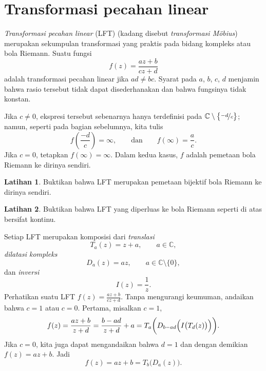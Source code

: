 \documentclass[12pt,openany]{book}
\newcommand{\C}{{\mathbb{C}}}
\newcommand{\myindex}[1]{#1\index{#1}}
\theoremstyle{plain}
\theoremstyle{remark}
\theoremstyle{definition}
\newenvironment{exbox}{%
    \def\FrameCommand{\vrule width 1pt \relax\hspace{10pt}}%
    \MakeFramed{\advance\hsize-\width\FrameRestore}%
}{%
    \endMakeFramed
}
\theoremstyle{exercise}
\newtheorem{exercise}{Latihan}[section]
\theoremstyle{example}
\begin{document}

\section{Transformasi pecahan linear}

\emph{Transformasi pecahan linear}
(LFT)
(kadang disebut \emph{\myindex{transformasi M\"obius}})
merupakan sekumpulan transformasi yang praktis pada bidang kompleks atau bola
Riemann.
Suatu fungsi
\begin{equation*}
f(z) = \frac{a z + b}{c z + d}
\end{equation*}
adalah transformasi pecahan linear jika $ad \neq bc$.  Syarat pada
$a$, $b$, $c$, $d$ menjamin bahwa rasio tersebut tidak dapat disederhanakan dan bahwa
fungsinya tidak konstan.

Jika $c \neq 0$,
ekspresi tersebut sebenarnya hanya terdefinisi pada
$\C \setminus \bigl\{ \nicefrac{-d}{c} \bigr\}$;
namun, seperti pada bagian sebelumnya, kita tulis
\begin{equation*}
f\left(\frac{-d}{c}\right) = \infty, \qquad \text{dan} \qquad
f(\infty) = \frac{a}{c} .
\end{equation*}
Jika $c=0$, tetapkan $f(\infty) = \infty$.  Dalam kedua kasus, $f$ adalah pemetaan
bola Riemann ke dirinya sendiri.

\begin{exbox}
\begin{exercise}%
Buktikan bahwa LFT merupakan pemetaan bijektif bola Riemann ke dirinya sendiri.
\end{exercise}

\begin{exercise}%
Buktikan bahwa LFT yang diperluas ke bola Riemann seperti di atas bersifat kontinu.
\end{exercise}
\end{exbox}

Setiap LFT merupakan komposisi dari \emph{translasi}
\begin{equation*}
T_a(z) = z + a , \qquad a \in \C,
\end{equation*}
\emph{dilatasi kompleks}
\begin{equation*}
D_a(z) = az , \qquad a \in \C \setminus \{ 0 \} ,
\end{equation*}
dan \emph{inversi}
\begin{equation*}
I(z) = \frac{1}{z}.
\end{equation*}
Perhatikan suatu LFT $f(z) = \frac{az+b}{cz+d}$.
Tanpa mengurangi keumuman, andaikan bahwa $c=1$ atau $c=0$.
Pertama, misalkan $c=1$,
\begin{equation*}
f(z)
=
\frac{a z + b}{z + d}
=
\frac{b-ad}{z+d}+a
=
T_a\biggr(D_{b-ad}\Bigl(I\bigl(T_d(z)\bigr)\Bigr)\biggr) .
\end{equation*}
Jika $c=0$, kita juga dapat mengandaikan bahwa $d=1$ dan
dengan demikian $f(z) = az + b$.  Jadi
\begin{equation*}
f(z) = az+b = T_b\bigl(D_a(z)\bigr) .
\end{equation*}
\end{document}
